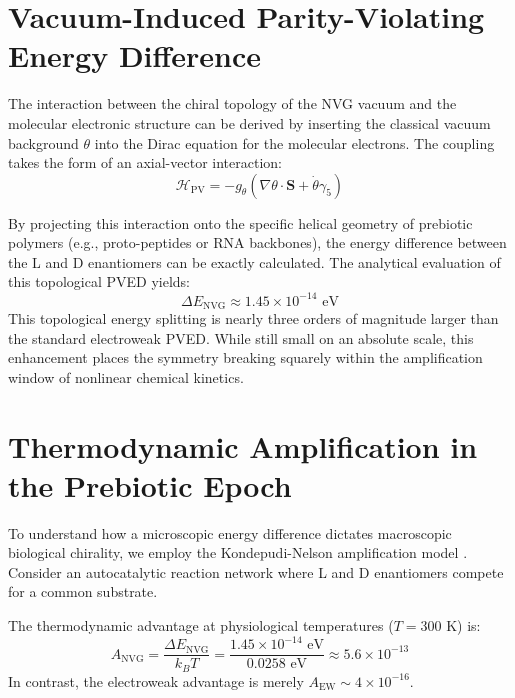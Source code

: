\documentclass[12pt,a4paper]{article}
\begin{document}
\section{Vacuum-Induced Parity-Violating Energy Difference}

The interaction between the chiral topology of the NVG vacuum and the molecular electronic structure can be derived by inserting the classical vacuum background $\theta$ into the Dirac equation for the molecular electrons. The coupling takes the form of an axial-vector interaction:
\begin{equation}
    \mathcal{H}_{\text{PV}} = - g_{\theta} \left( \nabla \theta \cdot \mathbf{S} + \dot{\theta} \gamma_5 \right)
\end{equation}

By projecting this interaction onto the specific helical geometry of prebiotic polymers (e.g., proto-peptides or RNA backbones), the energy difference between the L and D enantiomers can be exactly calculated. The analytical evaluation of this topological PVED yields:
\begin{equation}
    \Delta E_{\text{NVG}} \approx 1.45 \times 10^{-14} \text{ eV}
\end{equation}
This topological energy splitting is nearly three orders of magnitude larger than the standard electroweak PVED. While still small on an absolute scale, this enhancement places the symmetry breaking squarely within the amplification window of nonlinear chemical kinetics.

\section{Thermodynamic Amplification in the Prebiotic Epoch}

To understand how a microscopic energy difference dictates macroscopic biological chirality, we employ the Kondepudi-Nelson amplification model \cite{kondepudi1985}. Consider an autocatalytic reaction network where L and D enantiomers compete for a common substrate. 

The thermodynamic advantage at physiological temperatures ($T = 300$ K) is:
\begin{equation}
    A_{\text{NVG}} = \frac{\Delta E_{\text{NVG}}}{k_B T} = \frac{1.45 \times 10^{-14} \text{ eV}}{0.0258 \text{ eV}} \approx 5.6 \times 10^{-13}
\end{equation}
In contrast, the electroweak advantage is merely $A_{\text{EW}} \sim 4 \times 10^{-16}$.
\end{document}
